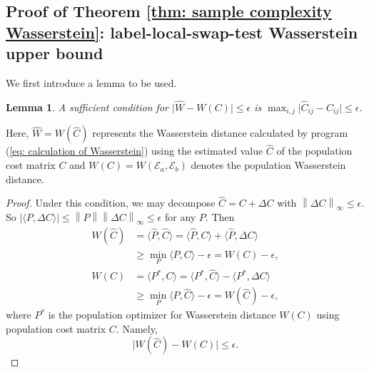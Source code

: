 \documentclass[aps,prx,reprint,superscriptaddress,amsmath,amssymb,longbibliography,floatfix]{revtex4-2}
\newcommand{\norm}[1]{\left \lVert #1 \right \rVert}
\newcommand{\abs}[1]{\lvert #1\rvert}
\newcommand{\scE}{\mathcal{E}}
\theoremstyle{plain}
\newtheorem{lemma}[theorem]{Lemma}
\theoremstyle{definition}
\theoremstyle{remark}
\begin{document}
\subsection{Proof of Theorem \ref{thm: sample complexity Wasserstein}: label-local-swap-test Wasserstein upper bound}\label{appsub: proof of Wasserstein upper bound}
We first introduce a lemma to be used.
\begin{lemma}\label{lm: maxCij}
A sufficient condition for $\abs{\widehat{W}-W(C)}\leq \epsilon$ is $\max_{i,j} \abs{\widehat{C}_{ij}-C_{ij}} \leq \epsilon$. 
\end{lemma}
Here, $\widehat{W} = W(\widehat{C})$ represents the Wasserstein distance calculated by program (\ref{eq: calculation of Wasserstein}) using the estimated value $\widehat{C}$ of the population cost matrix $C$ and $W(C) = W(\scE_a,\scE_b)$ denotes the population Wasserstein distance.
\begin{proof}
    Under this condition, we may decompose $\widehat{C} = C+\Delta C$ with $\norm{\Delta C}_\infty \leq \epsilon$. So $\abs{\langle P,\Delta C\rangle} \leq \norm{P}\norm{\Delta C}_\infty \leq  \epsilon$ for any $P$. Then
    \begin{equation*}
    \begin{aligned}
    W(\widehat{C})
    &= \langle \widehat{P}, \widehat{C}\rangle 
    = \langle \widehat{P}, C\rangle + \langle \widehat{P}, \Delta C\rangle \\
    &\ge \min_{P}\langle P, C\rangle - \epsilon
    = W(C)-\epsilon,\\
    W(C)
    &= \langle P^{*}, C\rangle = \langle P^{*}, \widehat{C}\rangle - \langle P^{*}, \Delta C\rangle \\
    &\ge \min_{P}\langle P, \widehat{C}\rangle - \epsilon
    = W(\widehat{C})-\epsilon ,
    \end{aligned}
    \end{equation*}
where $P^*$ is the population optimizer for Wasserstein distance $W(C)$ using population cost matrix $C$. Namely,  \begin{equation}\abs{W(\widehat{C})-W(C)}\leq \epsilon.
\label{eq:app-wasserstein-cost-error}
\end{equation}
\end{proof}
\end{document}
